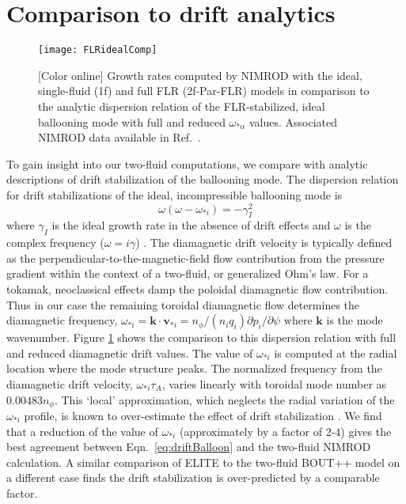 \section{Comparison to drift analytics}
\label{sec:analyticComp}

\begin{figure}
  \centering
  \texttt{[image: FLRidealComp]}
  \vspace{-4mm}
  \caption{[Color online]
  Growth rates computed by NIMROD with the ideal, single-fluid (1f) and full
  FLR (2f-Par-FLR) models in comparison to the analytic dispersion relation of
  the FLR-stabilized, ideal ballooning mode with full and reduced $\omega_{*\alpha}$ 
  values. Associated NIMROD data available in Ref.~\cite{king16Z}.}
  \label{FLRidealComp}
\end{figure}

To gain insight into our two-fluid computations, we compare with analytic
descriptions of drift stabilization of the ballooning mode.  The dispersion
relation for drift stabilizations of the ideal, incompressible ballooning mode
is
\begin{equation}
\omega (\omega - \omega_{*i}) = - \gamma_I^2
\label{eq:driftBalloon}
\end{equation}
where $\gamma_I$ is the ideal growth rate in the absence of drift effects and
$\omega$ is the complex frequency ($\omega=i\gamma$) \cite{tang82}.  The
diamagnetic drift velocity is typically defined as the
perpendicular-to-the-magnetic-field flow contribution from the pressure
gradient within the context of a two-fluid, or generalized Ohm's law.  For a
tokamak, neoclassical effects damp the poloidal diamagnetic flow contribution.
Thus in our case the remaining toroidal diamagnetic flow determines the
diamagnetic frequency, $\omega_{*i}= \mathbf{k}\cdot\mathbf{v}_{*i} =
n_\phi/(n_iq_i)\partial p_i/\partial \psi$ where $\mathbf{k}$ is the mode
wavenumber.  Figure \ref{FLRidealComp} shows the comparison to this dispersion
relation with full and reduced diamagnetic drift values. The value of
$\omega_{*i}$ is computed at the radial location where the mode structure
peaks.  The normalized frequency from the diamagnetic drift velocity,
$\omega_{*i}\tau_A$, varies linearly with toroidal mode number as
$0.00483n_\phi$.  This `local' approximation, which neglects the radial
variation of the $\omega_{*i}$ profile, is known to over-estimate the effect of
drift stabilization \cite{Hastie00,Snyder11}.  We find that a reduction of the
value of $\omega_{*i}$ (approximately by a factor of 2-4) gives the best
agreement between Eqn.~\eqref{eq:driftBalloon} and the two-fluid NIMROD
calculation.  A similar comparison of ELITE to the two-fluid BOUT++ model on a
different case finds the drift stabilization is over-predicted \cite{Snyder11}
by a comparable factor.

